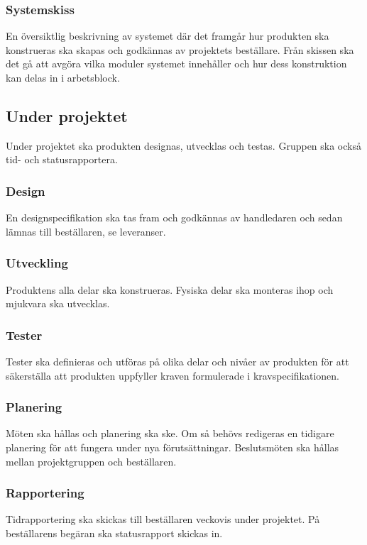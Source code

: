 \documentclass{article}
\begin{document}
\subsubsection{Systemskiss}
En översiktlig beskrivning av systemet där det framgår hur produkten ska konstrueras ska skapas och godkännas av projektets beställare. Från skissen ska det gå att avgöra vilka moduler systemet innehåller och hur dess konstruktion kan delas in i arbetsblock.

\subsection{Under projektet}
Under projektet ska produkten designas, utvecklas och testas. Gruppen ska också tid- och statusrapportera.

\subsubsection{Design}
En designspecifikation ska tas fram och godkännas av handledaren och sedan lämnas till beställaren, se leveranser. 

\subsubsection{Utveckling}
Produktens alla delar ska konstrueras. Fysiska delar ska monteras ihop och mjukvara ska utvecklas.

\subsubsection{Tester}
Tester ska definieras och utföras på olika delar och nivåer av produkten för att säkerställa att produkten uppfyller kraven formulerade i kravspecifikationen.

\subsubsection{Planering}
Möten ska hållas och planering ska ske. Om så behövs redigeras en tidigare planering för att fungera under nya förutsättningar. Beslutsmöten ska hållas mellan projektgruppen och beställaren.

\subsubsection{Rapportering}
Tidrapportering ska skickas till beställaren veckovis under projektet. På beställarens begäran ska statusrapport skickas in.
\end{document}
